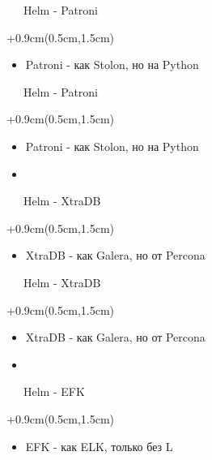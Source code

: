 \documentclass[xetex,18pt,aspectratio=43]{beamer}
\begin{document}
\begin{Large}
\begin{frame}{\ \ \ Helm - Patroni}
\begin{textblock*}{\framewidth+0.9cm}(0.5cm,1.5cm)
\begin{itemize}
  \item Patroni - как Stolon, но на Python
\end{itemize}
\end{textblock*}
\end{frame}

\begin{frame}{\ \ \ Helm - Patroni}
\begin{textblock*}{\framewidth+0.9cm}(0.5cm,1.5cm)
\begin{itemize}
  \item Patroni - как Stolon, но на Python
  \item \href{https://github.com/alexclear/k8s-patroni-lab}{\color{linkcolor}{github.com/alexclear/k8s-patroni-lab}}
\end{itemize}
\end{textblock*}
\end{frame}

\begin{frame}{\ \ \ Helm - XtraDB}
\begin{textblock*}{\framewidth+0.9cm}(0.5cm,1.5cm)
\begin{itemize}
  \item XtraDB - как Galera, но от Percona
\end{itemize}
\end{textblock*}
\end{frame}

\begin{frame}{\ \ \ Helm - XtraDB}
\begin{textblock*}{\framewidth+0.9cm}(0.5cm,1.5cm)
\begin{itemize}
  \item XtraDB - как Galera, но от Percona
  \item \href{https://github.com/alexclear/k8s-percona-xtradb-cluster-lab}{\color{linkcolor}{github.com/alexclear/k8s-percona-xtradb-cluster-lab}}
\end{itemize}
\end{textblock*}
\end{frame}

\begin{frame}{\ \ \ Helm - EFK}
\begin{textblock*}{\framewidth+0.9cm}(0.5cm,1.5cm)
\begin{itemize}
  \item EFK - как ELK, только без L
\end{itemize}
\end{textblock*}
\end{frame}


\end{Large}
\end{document}
